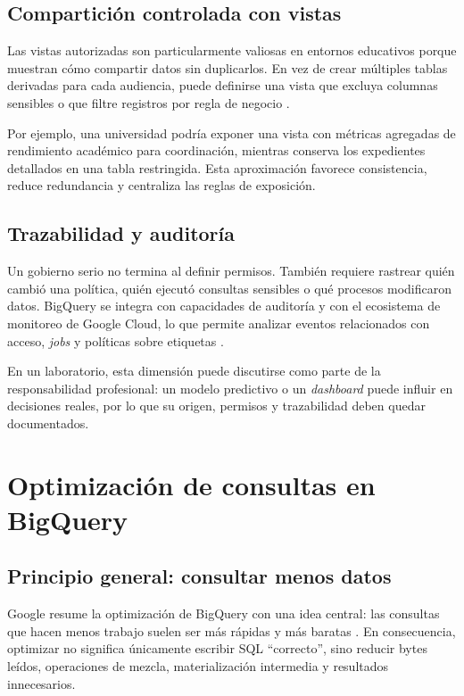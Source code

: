 \documentclass[12pt]{article}
\begin{document}
\subsection{Compartición controlada con vistas}
Las vistas autorizadas son particularmente valiosas en entornos educativos porque muestran cómo compartir datos sin duplicarlos. En vez de crear múltiples tablas derivadas para cada audiencia, puede definirse una vista que excluya columnas sensibles o que filtre registros por regla de negocio \cite{gcp_authorized_views}.

Por ejemplo, una universidad podría exponer una vista con métricas agregadas de rendimiento académico para coordinación, mientras conserva los expedientes detallados en una tabla restringida. Esta aproximación favorece consistencia, reduce redundancia y centraliza las reglas de exposición.

\subsection{Trazabilidad y auditoría}
Un gobierno serio no termina al definir permisos. También requiere rastrear quién cambió una política, quién ejecutó consultas sensibles o qué procesos modificaron datos. BigQuery se integra con capacidades de auditoría y con el ecosistema de monitoreo de Google Cloud, lo que permite analizar eventos relacionados con acceso, \textit{jobs} y políticas sobre etiquetas \cite{gcp_policy_tags_audit}.

En un laboratorio, esta dimensión puede discutirse como parte de la responsabilidad profesional: un modelo predictivo o un \textit{dashboard} puede influir en decisiones reales, por lo que su origen, permisos y trazabilidad deben quedar documentados.

\section{Optimización de consultas en BigQuery}
\subsection{Principio general: consultar menos datos}
Google resume la optimización de BigQuery con una idea central: las consultas que hacen menos trabajo suelen ser más rápidas y más baratas \cite{gcp_optimize_queries_overview,gcp_optimize_queries_compute}. En consecuencia, optimizar no significa únicamente escribir SQL ``correcto'', sino reducir bytes leídos, operaciones de mezcla, materialización intermedia y resultados innecesarios.
\end{document}
